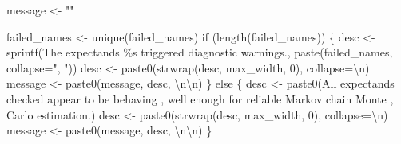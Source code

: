 \documentclass[
  letterpaper,
  DIV=11,
  numbers=noendperiod]{scrartcl}
\newenvironment{Shaded}{\begin{snugshade}}{\end{snugshade}}
\newcommand{\CharTok}[1]{\textcolor[rgb]{0.13,0.47,0.30}{#1}}
\newcommand{\ControlFlowTok}[1]{\textcolor[rgb]{0.00,0.23,0.31}{#1}}
\newcommand{\DecValTok}[1]{\textcolor[rgb]{0.68,0.00,0.00}{#1}}
\newcommand{\NormalTok}[1]{\textcolor[rgb]{0.00,0.23,0.31}{#1}}
\newcommand{\OperatorTok}[1]{\textcolor[rgb]{0.37,0.37,0.37}{#1}}
\newcommand{\SpecialCharTok}[1]{\textcolor[rgb]{0.37,0.37,0.37}{#1}}
\newcommand{\StringTok}[1]{\textcolor[rgb]{0.13,0.47,0.30}{#1}}
\begin{document}
\begin{Shaded}
\begin{Highlighting}[]
\NormalTok{  message }\OperatorTok{\textless{}{-}} \StringTok{""}
  
\NormalTok{  failed\_names }\OperatorTok{\textless{}{-}}\NormalTok{ unique(failed\_names)}
  \ControlFlowTok{if}\NormalTok{ (length(failed\_names)) \{}
\NormalTok{    desc }\OperatorTok{\textless{}{-}} 
\NormalTok{      sprintf(}\StringTok{\textquotesingle{}The expectands }\SpecialCharTok{\%s}\StringTok{ triggered diagnostic warnings.\textquotesingle{}}\NormalTok{,}
\NormalTok{              paste(failed\_names, collapse}\OperatorTok{=}\StringTok{", "}\NormalTok{))}
\NormalTok{    desc }\OperatorTok{\textless{}{-}}\NormalTok{ paste0(strwrap(desc, max\_width, }\DecValTok{0}\NormalTok{), collapse}\OperatorTok{=}\StringTok{\textquotesingle{}}\CharTok{\textbackslash{}n}\StringTok{\textquotesingle{}}\NormalTok{)}
\NormalTok{    message }\OperatorTok{\textless{}{-}}\NormalTok{ paste0(message, desc, }\StringTok{\textquotesingle{}}\CharTok{\textbackslash{}n\textbackslash{}n}\StringTok{\textquotesingle{}}\NormalTok{)}
\NormalTok{  \} }\ControlFlowTok{else}\NormalTok{ \{}
\NormalTok{    desc }\OperatorTok{\textless{}{-}}\NormalTok{ paste0(}\StringTok{\textquotesingle{}All expectands checked appear to be behaving \textquotesingle{}}\NormalTok{,}
                   \StringTok{\textquotesingle{}well enough for reliable Markov chain Monte \textquotesingle{}}\NormalTok{,}
                   \StringTok{\textquotesingle{}Carlo estimation.\textquotesingle{}}\NormalTok{)}
\NormalTok{    desc }\OperatorTok{\textless{}{-}}\NormalTok{ paste0(strwrap(desc, max\_width, }\DecValTok{0}\NormalTok{), collapse}\OperatorTok{=}\StringTok{\textquotesingle{}}\CharTok{\textbackslash{}n}\StringTok{\textquotesingle{}}\NormalTok{)}
\NormalTok{    message }\OperatorTok{\textless{}{-}}\NormalTok{ paste0(message, desc, }\StringTok{\textquotesingle{}}\CharTok{\textbackslash{}n\textbackslash{}n}\StringTok{\textquotesingle{}}\NormalTok{)}
\NormalTok{  \}}


\end{Highlighting}
\end{Shaded}
\end{document}

